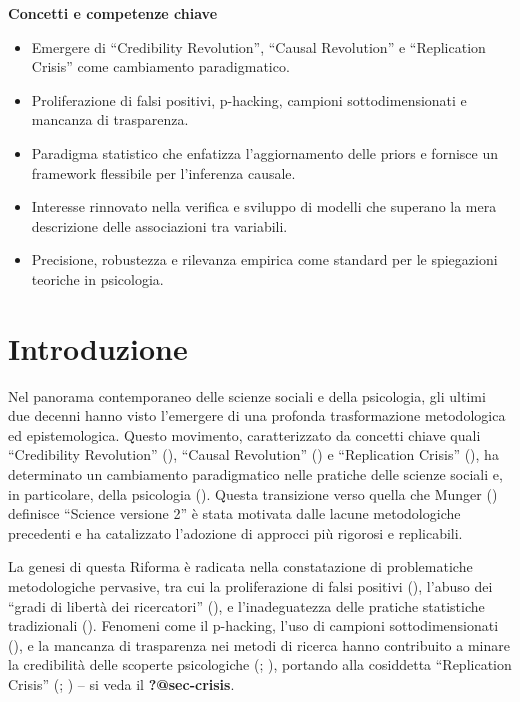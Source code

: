 \documentclass[
  letterpaper,
  DIV=11,
  numbers=noendperiod]{scrreprt}
\providecommand{\tightlist}{%
  \setlength{\itemsep}{0pt}\setlength{\parskip}{0pt}}\usepackage{longtable,booktabs,array}
\theoremstyle{definition}
\theoremstyle{remark}
\begin{document}
\textbf{Concetti e competenze chiave}

\begin{itemize}
\tightlist
\item
  Emergere di ``Credibility Revolution'', ``Causal Revolution'' e
  ``Replication Crisis'' come cambiamento paradigmatico.
\item
  Proliferazione di falsi positivi, p-hacking, campioni
  sottodimensionati e mancanza di trasparenza.
\item
  Paradigma statistico che enfatizza l'aggiornamento delle priors e
  fornisce un framework flessibile per l'inferenza causale.
\item
  Interesse rinnovato nella verifica e sviluppo di modelli che superano
  la mera descrizione delle associazioni tra variabili.
\item
  Precisione, robustezza e rilevanza empirica come standard per le
  spiegazioni teoriche in psicologia.
\end{itemize}

\section*{Introduzione}\label{introduzione-4}


Nel panorama contemporaneo delle scienze sociali e della psicologia, gli
ultimi due decenni hanno visto l'emergere di una profonda trasformazione
metodologica ed epistemologica. Questo movimento, caratterizzato da
concetti chiave quali ``Credibility Revolution''
(),
``Causal Revolution'' () e ``Replication Crisis''
(), ha determinato
un cambiamento paradigmatico nelle pratiche delle scienze sociali e, in
particolare, della psicologia
().
Questa transizione verso quella che Munger
() definisce ``Science versione
2'' è stata motivata dalle lacune metodologiche precedenti e ha
catalizzato l'adozione di approcci più rigorosi e replicabili.

La genesi di questa Riforma è radicata nella constatazione di
problematiche metodologiche pervasive, tra cui la proliferazione di
falsi positivi (),
l'abuso dei ``gradi di libertà dei ricercatori''
(), e
l'inadeguatezza delle pratiche statistiche tradizionali
(). Fenomeni
come il p-hacking, l'uso di campioni sottodimensionati
(), e la mancanza di
trasparenza nei metodi di ricerca hanno contribuito a minare la
credibilità delle scoperte psicologiche
(;
), portando alla cosiddetta
``Replication Crisis'' (;
) -- si veda il
\textbf{?@sec-crisis}.
\end{document}
